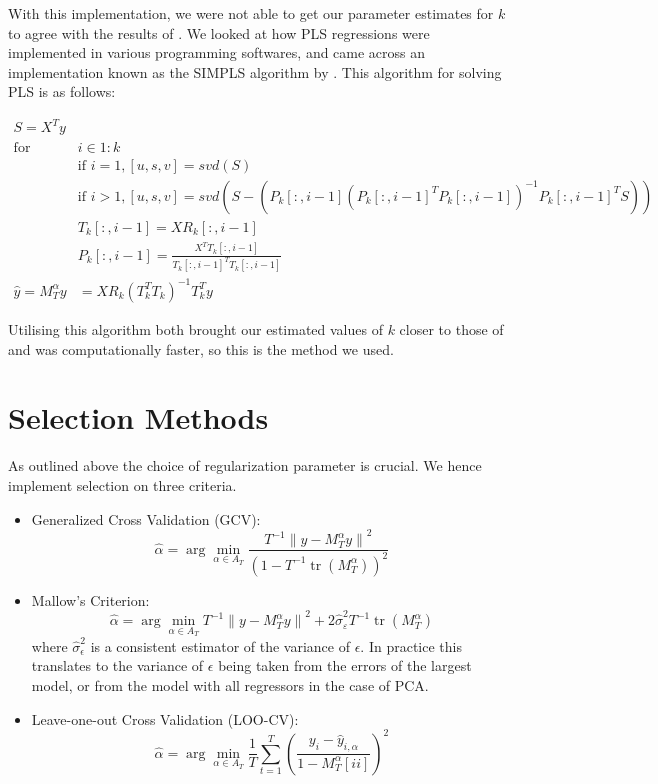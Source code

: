 With this implementation, we were not able to get our parameter estimates for $k$ to agree with the results of \citeauthor{carrasco2016sample}. We looked at how PLS regressions were implemented in various programming softwares, and came across an implementation known as the SIMPLS algorithm by \citeauthor{de1993simpls}. This algorithm for solving PLS is as follows:

\begin{align}
\nonumber S = X^{T} y & \\
\nonumber \text{for } & i \in 1:k \\
\nonumber &\text{if } i = 1, [u, s, v] = svd(S) \\
\nonumber &\text{if } i > 1, [u, s, v] = svd(S - (P_{k}[:, i-1](P_{k}[:, i-1]^{T} P_{k}[:, i-1])^{-1} P_{k}[:, i-1]^{T} S)) \\
\nonumber &T_{k}[:, i - 1] = X R_{k}[:, i - 1] \\
\nonumber &P_{k}[:, i - 1] = \frac{X^{T} T_{k}[:, i - 1]}{T_{k}[:, i - 1]^{T}T_{k}[:, i - 1]} \\
\nonumber \widehat{y} = M^{\alpha}_{T} y &= X R_{k} (T^{T}_{k} T_{k})^{-1} T^{T}_{k} y
\end{align}

Utilising this algorithm both brought our estimated values of $k$ closer to those of \citeauthor{carrasco2016sample} and was computationally faster, so this is the method we used.

\section{Selection Methods} \label{sec::cv}

As outlined above the choice of regularization parameter is crucial. We hence implement selection on three criteria.

\begin{itemize}
	\item Generalized Cross Validation (GCV): \\
\[\hat{\alpha}=\arg \min _{\alpha \in A_{T}} \frac{T^{-1}\left\|y-M_{T}^{\alpha} y\right\|^{2}}{\left(1-T^{-1} \operatorname{tr}\left(M_{T}^{\alpha}\right)\right)^{2}}\]

	\item Mallow's Criterion: \\
\[\hat{\alpha}=\arg \min _{\alpha \in A_{T}} T^{-1}\left\|y-M_{T}^{\alpha} y\right\|^{2}+2 \widehat{\sigma}_{\varepsilon}^{2} T^{-1} \operatorname{tr}\left(M_{T}^{\alpha}\right)\]
where $\widehat{\sigma}_{\epsilon}^{2}$ is a consistent estimator of the variance of $\epsilon$. In practice this translates to the variance of $\epsilon$ being taken from the errors of the largest model, or from the model with all regressors in the case of PCA.

	\item Leave-one-out Cross Validation (LOO-CV): \\
\[\hat{\alpha}=\arg \min _{\alpha \in A_{T}} \frac{1}{T} \sum_{t=1}^{T}\left(\frac{y_{i}-\hat{y}_{i, \alpha}}{1-M_{T}^{\alpha}[ii]}\right)^{2}\]

\end{itemize}

